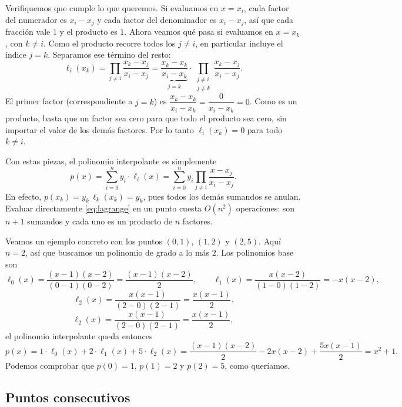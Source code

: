 Verifiquemos que cumple lo que queremos. Si evaluamos en $x = x_i$, cada factor del numerador es $x_i - x_j$ y cada factor del denominador es $x_i - x_j$, así que cada fracción vale $1$ y el producto es $1$. Ahora veamos qué pasa si evaluamos en $x=x_k$, con $k\neq i$. Como el producto recorre todos los $j\neq i$, en particular incluye el índice $j=k$. Separamos ese término del resto:
\[
\ell_i(x_k)=\prod_{j\neq i} \frac{x_k-x_j}{x_i-x_j}
= \underbrace{\frac{x_k-x_k}{x_i-x_k}}_{j=k} \cdot
\prod_{\substack{j\neq i \\ j\neq k}} \frac{x_k-x_j}{x_i-x_j}.
\]
El primer factor (correspondiente a $j=k$) es $\dfrac{x_k-x_k}{x_i-x_k}=\dfrac{0}{x_i-x_k}=0$.
Como es un producto, basta que un factor sea cero para que todo el producto sea cero,
sin importar el valor de los demás factores. Por lo tanto $\ell_i(x_k)=0$ para todo $k\neq i$.

Con estas piezas, el polinomio interpolante es simplemente
\begin{equation}\label{eq:lagrange}
p(x) = \sum_{i=0}^{n} y_i \cdot \ell_i(x) = \sum_{i=0}^{n} y_i \prod_{j \neq i} \frac{x - x_j}{x_i - x_j}.
\end{equation}
En efecto, $p(x_k)=y_k\,\ell_k(x_k)=y_k$, pues todos los demás sumandos se anulan. Evaluar directamente \eqref{eq:lagrange} en un punto cuesta $O(n^2)$ operaciones: son $n+1$ sumandos y cada uno es un producto de $n$ factores.

Veamos un ejemplo concreto con los puntos $(0,1)$, $(1,2)$ y $(2,5)$. Aquí $n=2$, así que buscamos un polinomio de grado a lo más $2$. Los polinomios base son
\[
\ell_0(x)=\frac{(x-1)(x-2)}{(0-1)(0-2)}=\frac{(x-1)(x-2)}{2},\qquad
\ell_1(x)=\frac{x(x-2)}{(1-0)(1-2)}=-x(x-2),
\]
\[
\ell_2(x)=\frac{x(x-1)}{(2-0)(2-1)}=\frac{x(x-1)}{2}.
\]
\[
\ell_2(x)=\frac{x(x-1)}{(2-0)(2-1)}=\frac{x(x-1)}{2},
\]
el polinomio interpolante queda entonces
\[
p(x)=1\cdot\ell_0(x)+2\cdot\ell_1(x)+5\cdot\ell_2(x)
=\frac{(x-1)(x-2)}{2}-2x(x-2)+\frac{5x(x-1)}{2}=x^2+1.
\]
Podemos comprobar que $p(0)=1$, $p(1)=2$ y $p(2)=5$, como queríamos.

\subsection*{Puntos consecutivos}

